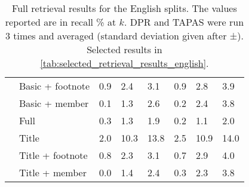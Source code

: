 \documentclass[11pt]{article}
\begin{document}
\begin{table*}[h]
\begin{tabular}{llllllll}
     & Basic + footnote &          0.9 &          2.4 &          3.1 &          0.9 &          2.8 &          3.9 \\
     & Basic + member &          0.1 &          1.3 &          2.6 &          0.2 &          2.4 &          3.8 \\
     & Full &          0.3 &          1.3 &          1.9 &          0.2 &          1.1 &          2.0 \\
     & Title &          2.0 &         10.3 &         13.8 &          2.5 &         10.9 &         14.0 \\
     & Title + footnote &          0.8 &          2.3 &          3.1 &          0.7 &          2.9 &          4.0 \\
     & Title + member &          0.0 &          1.4 &          2.4 &          0.3 &          2.3 &          3.8 \\
\bottomrule
\end{tabular}
    \caption{Full retrieval results for the English splits. The values reported are in recall \% at $k$. DPR and TAPAS were run 3 times and averaged (standard deviation given after ±). Selected results in \autoref{tab:selected_retrieval_results_english}.}
    \label{tab:full_retrieval_results_english}
\end{table*}
\end{document}
